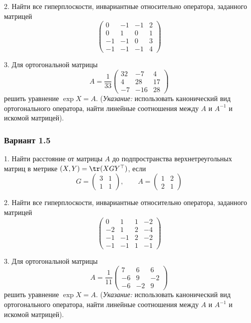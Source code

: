 \documentclass[a4paper]{article}
\begin{document}
2. Найти все гиперплоскости, инвариантные относительно оператора,
заданного матрицей
$$
\left(
\begin{array}{rrrr}
0 & -1& -1 & 2\\
0 & 1 & 0 & 1\\
-1 & -1 & 0 &3 \\
-1 & -1 & -1 &4
\end{array}\right )
$$

3. Для ортогональной матрицы
$$
A=\frac{1}{33} \left(
\begin{array}{rrr}
32 & -7 & 4\\
4 & 28 & 17 \\
-7 & -16 & 28
\end{array}\right)
$$
решить уравнение $\exp X=A$. ({\it Указание:} использовать
канонический вид ортогонального оператора, найти линейные
соотношения между $A$ и $A^{-1}$  и искомой матрицей).

\subsubsection{Вариант 1.5}

1. Найти расстояние от матрицы $A$ до подпространства
верхнетреугольных матриц в метрике $(X, Y)=\tr (XGY^\top)$, если
$$
G=\left(\begin{array}{rr} 3 & 1\\
1 & 1
\end{array}\right) ,\qquad
A=\left(
\begin{array}{rr} 1 & 2\\
2 & 1
\end{array}\right)
$$

2. Найти все гиперплоскости, инвариантные относительно оператора,
заданного матрицей
$$
\left(
\begin{array}{rrrr}
0 & 1& 1 & -2\\
-2 & 1 & 2 & -4\\
-1 & -1 & 2 &-2 \\
-1 & -1 & 1 &-1
\end{array}\right )
$$

3. Для ортогональной матрицы
$$
A=\frac{1}{11} \left(
\begin{array}{rrr}
7 & 6 & 6\\
-6 & 9 & -2 \\
-6 & -2 & 9
\end{array}\right)
$$
решить уравнение $\exp X=A$. ({\it Указание:} использовать
канонический вид ортогонального оператора, найти линейные
соотношения между $A$ и $A^{-1}$  и искомой матрицей).
\end{document}
